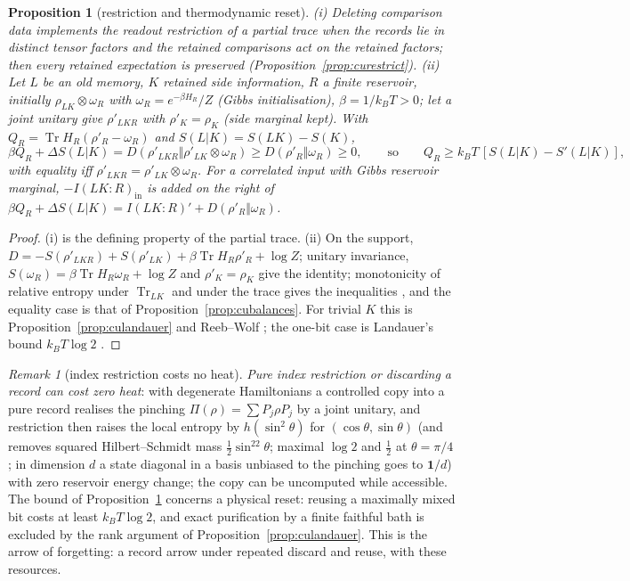 \documentclass[aps,pra,onecolumn,superscriptaddress,nofootinbib,10pt]{revtex4-2}
\newtheorem{proposition}[theorem]{Proposition}
\theoremstyle{definition}
\theoremstyle{remark}
\newtheorem{remark}[theorem]{Remark}
\newcommand{\tr}{\operatorname{Tr}}
\begin{document}
\begin{proposition}[restriction and thermodynamic reset]\label{prop:fmheat}
(i) Deleting comparison data implements the readout restriction of a partial trace when the records lie
in distinct tensor factors and the retained comparisons act on the retained factors; then every retained
expectation is preserved (Proposition~\ref{prop:curestrict}).
(ii) Let $L$ be an old memory, $K$ retained side information, $R$ a finite reservoir, initially $\rho_{LK}\otimes\omega_R$ with
$\omega_R=e^{-\beta H_R}/Z$ (Gibbs initialisation), $\beta=1/k_BT>0$; let a joint unitary give $\rho'_{LKR}$ with $\rho'_K=\rho_K$ (side marginal
kept).  With $Q_R=\tr H_R(\rho'_R-\omega_R)$ and $S(L|K)=S(LK)-S(K)$,
\[
\beta Q_R+\Delta S(L|K)=D(\rho'_{LKR}\Vert\rho'_{LK}\otimes\omega_R)\ge D(\rho'_R\Vert\omega_R)\ge0,\qquad\text{so}\qquad Q_R\ge k_BT\,[S(L|K)-S'(L|K)],
\]
with equality iff $\rho'_{LKR}=\rho'_{LK}\otimes\omega_R$.  For a correlated input with Gibbs reservoir marginal, $-I(LK{:}R)_{\mathrm{in}}$ is added on the
right of $\beta Q_R+\Delta S(L|K)=I(LK{:}R)'+D(\rho'_R\Vert\omega_R)$.
\end{proposition}
\begin{proof}
(i) is the defining property of the partial trace.  (ii) On the support, $D=-S(\rho'_{LKR})+S(\rho'_{LK})+\beta\tr H_R\rho'_R+\log Z$; unitary invariance,
$S(\omega_R)=\beta\tr H_R\omega_R+\log Z$ and $\rho'_K=\rho_K$ give the identity; monotonicity of relative entropy under $\tr_{LK}$ and under the
trace gives the inequalities \cite{n2-lindblad,n2-uhlmann-dpi}, and the equality case is that of
Proposition~\ref{prop:cubalances}.  For trivial $K$ this is Proposition~\ref{prop:culandauer} and Reeb--Wolf
\cite[Thm.~3]{n1-reeb}; the one-bit case is Landauer's bound $k_BT\log2$ \cite{n1-landauer,n2-bennett}.
\end{proof}

\begin{remark}[index restriction costs no heat]\label{rem:fmzeroheat}
\emph{Pure index restriction or discarding a record can cost zero heat}: with degenerate Hamiltonians a
controlled copy into a pure record realises the pinching $\Pi(\rho)=\sum P_j\rho P_j$ by a joint unitary, and restriction then
raises the local entropy by $h(\sin^2\theta)$ for $(\cos\theta,\sin\theta)$ (and removes squared Hilbert--Schmidt mass $\tfrac12\sin^22\theta$; maximal
$\log2$ and $\tfrac12$ at $\theta=\pi/4$; in dimension $d$ a state diagonal in a basis unbiased to the pinching goes to $\mathbf1/d$) with zero
reservoir energy change; the copy can be uncomputed while accessible.  The bound of
Proposition~\ref{prop:fmheat} concerns a physical reset: reusing a maximally mixed bit costs at least $k_BT\log2$, and
exact purification by a finite faithful bath is excluded by the rank argument of
Proposition~\ref{prop:culandauer}.  This is the arrow of forgetting: a record arrow under repeated discard and
reuse, with these resources.
\end{remark}
\end{document}
